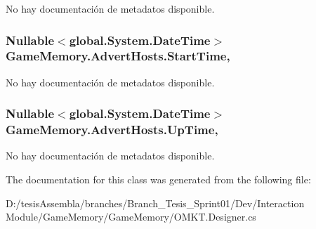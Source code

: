 No hay documentación de metadatos disponible. 

\hypertarget{class_game_memory_1_1_advert_hosts_a01dfdd5bd9e5b5970ae3e2768f33e6d6}{
\subsubsection[{Start\-Time}]{\setlength{\rightskip}{0pt plus 5cm}Nullable$<$global.\-System.\-Date\-Time$>$ Game\-Memory.\-Advert\-Hosts.\-Start\-Time\hspace{0.3cm}{\ttfamily [get]}, {\ttfamily [set]}}}\label{class_game_memory_1_1_advert_hosts_a01dfdd5bd9e5b5970ae3e2768f33e6d6}


No hay documentación de metadatos disponible. 

\hypertarget{class_game_memory_1_1_advert_hosts_a60aaa40a77a9d9a4df8f3e05df660496}{
\subsubsection[{Up\-Time}]{\setlength{\rightskip}{0pt plus 5cm}Nullable$<$global.\-System.\-Date\-Time$>$ Game\-Memory.\-Advert\-Hosts.\-Up\-Time\hspace{0.3cm}{\ttfamily [get]}, {\ttfamily [set]}}}\label{class_game_memory_1_1_advert_hosts_a60aaa40a77a9d9a4df8f3e05df660496}


No hay documentación de metadatos disponible. 



The documentation for this class was generated from the following file\-:\begin{DoxyCompactItemize}
\item 
D\-:/tesis\-Assembla/branches/\-Branch\-\_\-\-Tesis\-\_\-\-Sprint01/\-Dev/\-Interaction Module/\-Game\-Memory/\-Game\-Memory/O\-M\-K\-T.\-Designer.\-cs\end{DoxyCompactItemize}
